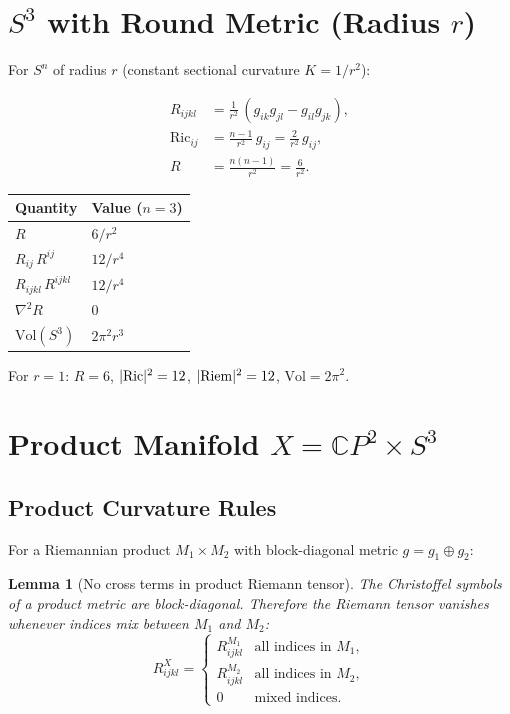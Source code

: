 \documentclass[11pt,a4paper]{article}
\newtheorem{lemma}{Lemma}
\begin{document}
\section{$S^3$ with Round Metric (Radius $r$)}

For $S^n$ of radius $r$ (constant sectional curvature $K = 1/r^2$):

\begin{align}
R_{ijkl} &= \frac{1}{r^2}\,(g_{ik}g_{jl} - g_{il}g_{jk}), \\
\mathrm{Ric}_{ij} &= \frac{n-1}{r^2}\,g_{ij} = \frac{2}{r^2}\,g_{ij}, \\
R &= \frac{n(n-1)}{r^2} = \frac{6}{r^2}.
\end{align}

\begin{center}
\begin{tabular}{ll}
\toprule
Quantity & Value ($n = 3$) \\
\midrule
$R$ & $6/r^2$ \\
$R_{ij}\,R^{ij}$ & $12/r^4$ \\
$R_{ijkl}\,R^{ijkl}$ & $12/r^4$ \\
$\nabla^2 R$ & 0 \\
$\mathrm{Vol}(S^3)$ & $2\pi^2 r^3$ \\
\bottomrule
\end{tabular}
\end{center}

\noindent
For $r = 1$: $R = 6$, $|{\rm Ric}|^2 = 12$, $|{\rm Riem}|^2 = 12$,
$\mathrm{Vol} = 2\pi^2$.


\section{Product Manifold $X = \mathbb{C}P^2 \times S^3$}

\subsection{Product Curvature Rules}

For a Riemannian product $M_1 \times M_2$ with block-diagonal metric
$g = g_1 \oplus g_2$:

\begin{lemma}[No cross terms in product Riemann tensor]
The Christoffel symbols of a product metric are block-diagonal. Therefore
the Riemann tensor vanishes whenever indices mix between $M_1$ and $M_2$:
\[
R^X_{ijkl} = \begin{cases}
  R^{M_1}_{ijkl} & \text{all indices in } M_1, \\
  R^{M_2}_{ijkl} & \text{all indices in } M_2, \\
  0 & \text{mixed indices.}
\end{cases}
\]
\end{lemma}
\end{document}
